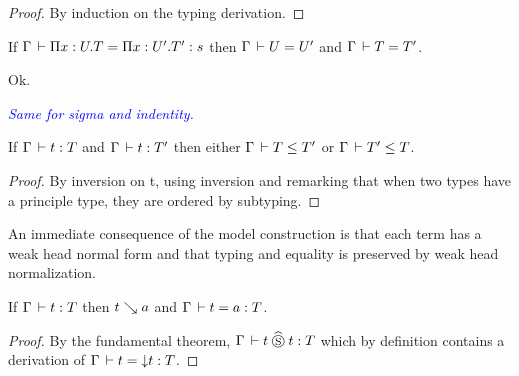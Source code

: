 \documentclass[a4paper,english]{lipics-utf8x}
\newcommand\meta[1]{\noindent\textcolor{blue}{\emph{#1}}}
\begin{document}
  \begin{proof}
    By induction on the typing derivation.
  \end{proof}

  \begin{lemma}
    If $\Gamma \,\vdash \Pi x:U.T = \Pi x:U'.T' : s$ then $\Gamma \,\vdash U = U'$
    and $\Gamma \,\vdash T = T'$.
  \end{lemma}
  Ok.

  \meta{Same for sigma and indentity.}

  \begin{lemma}
    If $\Gamma \,\vdash t : T$ and $\Gamma \,\vdash t : T'$ then either
    $\Gamma \,\vdash T \le T'$ or $\Gamma \,\vdash T' \le T$.
  \end{lemma}

  \begin{proof}
    By inversion on t, using inversion and remarking that when two types
    have a principle type, they are ordered by subtyping.
  \end{proof}


  An immediate consequence of the model construction is that each term has a
  weak head normal form and that typing and equality is preserved by weak head
  normalization.

  \begin{theorem}
    If $\Gamma \,\vdash t : T$ then $t \searrow a$ and $\Gamma \,\vdash t = a : T$.
  \end{theorem}

  \begin{proof}
    By the fundamental theorem, $\Gamma \,\vdash t \mathrel{\widehat{\mathrel{\circledS}}} t : T$ which by definition
    contains a derivation of $\Gamma \,\vdash t = {\downarrow} t : T$.
  \end{proof}
\end{document}
